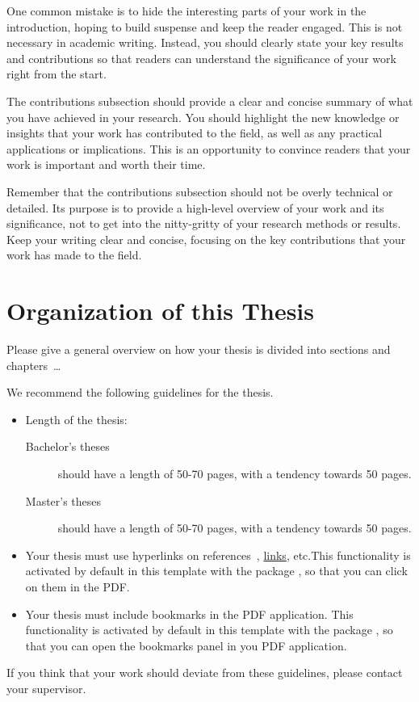 One common mistake is to hide the interesting parts of your work in the introduction, hoping to build suspense and keep the reader engaged. This is not necessary in academic writing. Instead, you should clearly state your key results and contributions so that readers can understand the significance of your work right from the start.

The contributions subsection should provide a clear and concise summary of what you have achieved in your research. You should highlight the new knowledge or insights that your work has contributed to the field, as well as any practical applications or implications. This is an opportunity to convince readers that your work is important and worth their time.

Remember that the contributions subsection should not be overly technical or detailed. Its purpose is to provide a high-level overview of your work and its significance, not to get into the nitty-gritty of your research methods or results. Keep your writing clear and concise, focusing on the key contributions that your work has made to the field.

\section{Organization of this Thesis}
Please give a general overview on how your thesis is divided into sections and chapters~\dots

We recommend the following guidelines for the thesis.

\begin{itemize}
    \item Length of the thesis:
    \begin{description}
        \item[Bachelor's theses] should have a length of 50-70 pages, with a tendency towards 50 pages.
        \item[Master's theses] should have a length of 50-70 pages, with a tendency towards 50 pages.
    \end{description}
    \item Your thesis must use hyperlinks on references~\cite{AviramSSHDSVAHD16}, \href{https://example.com}{links}, etc.This functionality is activated by default in this template with the package , so that you can click on them in the PDF.
    \item Your thesis must include bookmarks in the PDF application. This functionality is activated by default in this template with the package , so that you can open the bookmarks panel in you PDF application.
\end{itemize}

If you think that your work should deviate from these guidelines, please contact your supervisor.